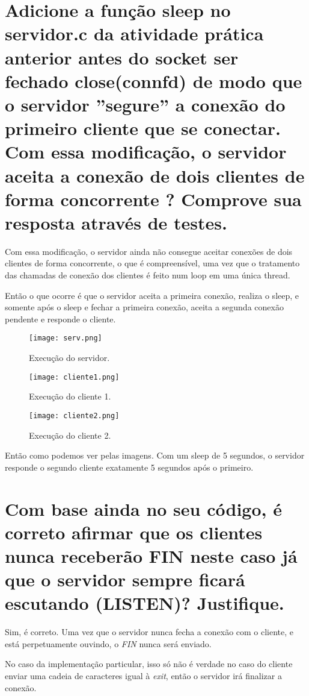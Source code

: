 \documentclass[12pt,a4paper]{report}
\begin{document}
\section{Adicione a função sleep no servidor.c da atividade prática anterior antes do socket ser fechado
close(connfd) de modo que o servidor ''segure'' a conexão do primeiro cliente que se conectar. Com
essa modificação, o servidor aceita a conexão de dois clientes de forma concorrente ? Comprove sua
resposta através de testes.}

Com essa modificação, o servidor ainda não consegue aceitar conexões de dois clientes de forma concorrente, o que é compreensível, uma vez que o tratamento das chamadas de conexão dos clientes é feito num loop em uma única thread.

Então o que ocorre é que o servidor aceita a primeira conexão, realiza o sleep, e somente após o sleep e fechar a primeira conexão, aceita a segunda conexão pendente e responde o cliente.

\begin{figure}[H]
  \texttt{[image: serv.png]}
  \caption{Execução do servidor.}
\end{figure}

\begin{figure}[H]
  \texttt{[image: cliente1.png]}
  \caption{Execução do cliente 1.}
\end{figure}

\begin{figure}[H]
  \texttt{[image: cliente2.png]}
  \caption{Execução do cliente 2.}
\end{figure}

Então como podemos ver pelas imagens. Com um sleep de 5 segundos, o servidor responde o segundo cliente exatamente 5 segundos após o primeiro.

\section{Com base ainda no seu código, é correto afirmar que os clientes nunca receberão FIN neste
caso já que o servidor sempre ficará escutando (LISTEN)? Justifique.}
Sim, é correto. Uma vez que o servidor nunca fecha a conexão com o cliente, e está perpetuamente ouvindo, o \emph{FIN} nunca será enviado.

No caso da implementação particular, isso só não é verdade no caso do cliente enviar uma cadeia de caracteres igual à \emph{exit}, então o servidor irá finalizar a conexão.
\end{document}
